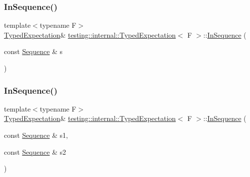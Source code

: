 \mbox{\label{classtesting_1_1internal_1_1_typed_expectation_ada9e9081a98435991310ac60483d1230}} 
\subsubsection{\texorpdfstring{In\+Sequence()}{InSequence()}\hspace{0.1cm}{\footnotesize\ttfamily [1/5]}}
{\footnotesize\ttfamily template$<$typename F$>$ \\
\hyperlink{classtesting_1_1internal_1_1_typed_expectation}{Typed\+Expectation}\& \hyperlink{classtesting_1_1internal_1_1_typed_expectation}{testing\+::internal\+::\+Typed\+Expectation}$<$ F $>$\+::\hyperlink{classtesting_1_1_in_sequence}{In\+Sequence} (\begin{DoxyParamCaption}\item[{const \hyperlink{classtesting_1_1_sequence}{Sequence} \&}]{s }\end{DoxyParamCaption})\hspace{0.3cm}{\ttfamily [inline]}}

\mbox{\label{classtesting_1_1internal_1_1_typed_expectation_ac0f45c73e3f816796f6c5dea2dc70131}} 
\subsubsection{\texorpdfstring{In\+Sequence()}{InSequence()}\hspace{0.1cm}{\footnotesize\ttfamily [2/5]}}
{\footnotesize\ttfamily template$<$typename F$>$ \\
\hyperlink{classtesting_1_1internal_1_1_typed_expectation}{Typed\+Expectation}\& \hyperlink{classtesting_1_1internal_1_1_typed_expectation}{testing\+::internal\+::\+Typed\+Expectation}$<$ F $>$\+::\hyperlink{classtesting_1_1_in_sequence}{In\+Sequence} (\begin{DoxyParamCaption}\item[{const \hyperlink{classtesting_1_1_sequence}{Sequence} \&}]{s1,  }\item[{const \hyperlink{classtesting_1_1_sequence}{Sequence} \&}]{s2 }\end{DoxyParamCaption})\hspace{0.3cm}{\ttfamily [inline]}}

